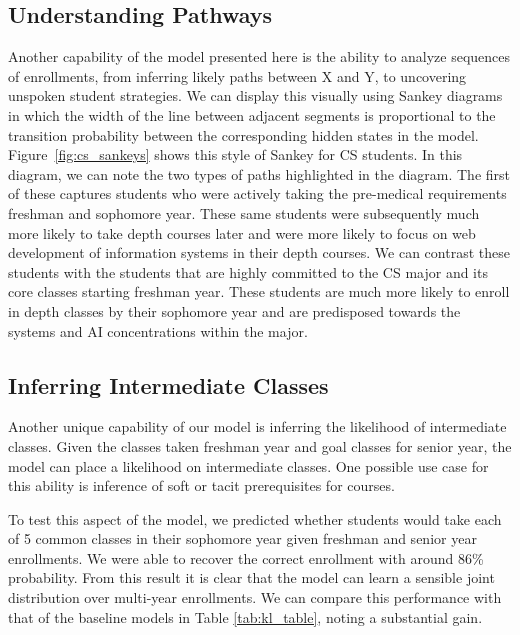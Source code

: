 \documentclass{edm_template}
\begin{document}
\subsection{Understanding Pathways}
\label{section:understanding-paths}
   

Another capability of the model presented here is the ability to analyze sequences of enrollments, from inferring likely paths between X and Y, to uncovering unspoken student strategies. We can display this visually using Sankey diagrams in which the width of the line between adjacent segments is proportional to the transition probability between the corresponding hidden states in the model. Figure~\ref{fig:cs_sankeys} shows this style of Sankey for CS students. In this diagram, we can note the two types of paths highlighted in the diagram. The first of these captures students who were actively taking the pre-medical requirements freshman and sophomore year. These same students were subsequently much more likely to take depth courses later and were more likely to focus on web development of information systems in their depth courses. We can contrast these students with the students that are highly committed to the CS major and its core classes starting freshman year. These students are much more likely to enroll in depth classes by their sophomore year and are predisposed towards the systems and AI concentrations within the major.
   
\subsection{Inferring Intermediate Classes}
\label{section:inference_task}


   
Another unique capability of our model is inferring the likelihood of intermediate classes. Given the classes taken freshman year and goal classes for senior year, the model can place a likelihood on intermediate classes. One possible use case for this ability is inference of soft or tacit prerequisites for courses. 

To test this aspect of the model, we predicted whether students would take each of 5 common classes in their sophomore year given freshman and senior year enrollments. We were able to recover the correct enrollment with around 86\% probability. From this result it is clear that the model can learn a sensible joint distribution over multi-year enrollments. We can compare this performance with that of the baseline models in Table \ref{tab:kl_table}, noting a substantial gain.  
\end{document}
